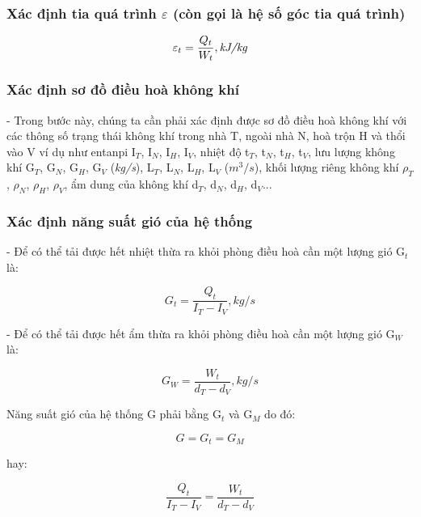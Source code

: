 \subsubsection{Xác định tia quá trình {\Large $\varepsilon$} (còn gọi là hệ số góc tia quá trình)}
\begin{equation}
	{\Large \varepsilon_{t}} =  \dfrac{Q_{t}}{W_{t}}, \textit{kJ/kg}
\end{equation}

\subsubsection{Xác định sơ đồ điều hoà không khí}
- Trong bước này, chúng ta cần phải xác định được sơ đồ điều hoà không khí với các thông số trạng thái không khí trong nhà T, ngoài nhà N, hoà trộn H và thổi vào V ví dụ như entanpi I$_{T}$, I$_{N}$, I$_{H}$, I$_{V}$, nhiệt độ t$_{T}$, t$_{N}$, t$_{H}$, t$_{V}$, lưu lượng không khí G$_{T}$, G$_{N}$, G$_{H}$, G$_{V}$ (\textit{kg/s}), L$_{T}$, L$_{N}$, L$_{H}$, L$_{V}$ (\textit{$m^3/s$}), khối lượng riêng không khí $\rho_{T}$, $\rho_{N}$, $\rho_{H}$, $\rho_{V}$, ẩm dung của không khí d$_{T}$, d$_{N}$, d$_{H}$, d$_{V}$...

\subsubsection{Xác định năng suất gió của hệ thống}
- Để có thể tải được hết nhiệt thừa ra khỏi phòng điều hoà cần một lượng gió G$_{t}$ là:

\begin{equation}
	G_{t} = \dfrac{Q_{t}}{I_{T} - I_{V}} , \textit{kg/s}
\end{equation}

- Để có thể tải được hết ẩm thừa ra khỏi phòng điều hoà cần một lượng gió G$_{W}$ là:

\begin{equation}
	 G_{W} = \dfrac{W_{t}}{d_{T} - d_{V}} , \textit{kg/s}
\end{equation}

Năng suất gió của hệ thống G phải bằng G$_{t}$ và G$_{M}$ do đó:

\begin{equation}
	G = G_{t} = G_{M}
\end{equation}

hay:

\begin{equation}
	 \dfrac{Q_{t}}{I_{T} - I_{V}}  = \dfrac{W_{t}}{d_{T} - d_{V}} 
\end{equation}


